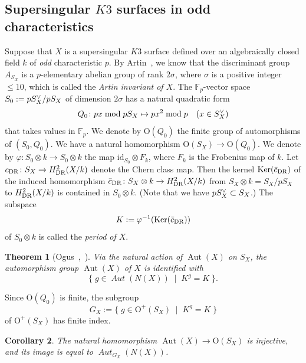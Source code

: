 \documentclass{amsart}
\theoremstyle{plain}
\newtheorem{theorem}{Theorem}[section]
\newtheorem{corollary}[theorem]{Corollary}
\theoremstyle{definition}
\theoremstyle{remark}
\numberwithin{equation}{section}
\numberwithin{table}{section}
\numberwithin{figure}{section}
\newcommand{\F}{\mathord{\mathbb F}}
\newcommand{\set}[2]{\{\; {#1} \; \mid \; {#2} \;  \}}
\newcommand{\tensor}{\otimes}
\newcommand{\inv}{\sp{-1}}
\newcommand{\dual}{\sp{\vee}}
\newcommand{\OG}{\mathord{\mathrm {O}}}
\newcommand{\id}{\mathord{\mathrm {id}}}
\newcommand{\Ker}{\operatorname{\mathrm {Ker}}\nolimits}
\newcommand{\Aut}{\operatorname{\mathrm {Aut}}\nolimits}
\newcommand{\aut}{\operatorname{\mathit {Aut}}\nolimits}
\newcommand{\discgr}[1]{A_{#1}}
\newcommand{\DR}{\mathord{{\rm DR}}}
\newcommand{\Nc}{N}
\begin{document}
\subsection{Supersingular $K3$ surfaces in odd characteristics}\label{subsec:AutssK3}
%
Suppose that  $X$ is a supersingular $K3$ surface defined over an algebraically closed field
$k$ of \emph{odd} characteristic $p$.
By Artin~\cite{MR0371899},
we know that the discriminant group  $\discgr{{S_X}}$
is a $p$-elementary abelian group of rank $2\sigma$,
where $\sigma$ is a positive integer $\le 10$,
which is called the \emph{Artin invariant of $X$}.
The $\F_p$-vector space 
$S_0:=p S_X\dual /p{S_X}$ of dimension $2\sigma$ has a 
natural quadratic form 
$$
Q_0\colon  px \bmod p{S_X} \mapsto px^2 \bmod p \quad (x\in S_X\dual)
$$
that takes values in $\F_p$.
We denote by $\OG(Q_0)$ the finite group of automorphisms of $(S_0, Q_0)$.
We have a natural homomorphism
$\OG({S_X}) \to \OG(Q_0)$.
We denote by  $\varphi\colon S_0\tensor k\to S_0\tensor k$
the map $\id_{S_0}\tensor F_k$,
where $F_k$ is the Frobenius map of $k$.
Let $c_{\DR}\colon {S_X}\to H^2_{\DR}(X/k)$ denote the Chern class map.
Then the kernel $\Ker (\bar{c}_{\DR})$ 
of the induced homomorphism $\bar{c}_{\DR}\colon {S_X}\tensor k \to H^2_{\DR}(X/k)$
from ${S_X}\tensor k=S_X/p S_X$ to $H^2_{\DR}(X/k)$
is contained in $S_0\tensor k$.
(Note that we have $p S_X\dual \subset S_X$.)
The subspace 
$$
K:=\varphi\inv(\Ker (\bar{c}_{\DR}))
$$
of $S_0\tensor k$ is called the 
\emph{period  of $X$}.
%
%
\begin{theorem}[Ogus~\cite{MR563467},~\cite{MR717616}]\label{thm:ssK3aut}
Via the natural action of $\Aut(X)$ on  ${S_X}$, 
the automorphism group $\Aut(X)$ of $X$ is identified with 
$$
\set{g\in \aut(\Nc(X))}{K^g=K}.
$$
\end{theorem}
%
Since $\OG(Q_0)$ is finite,
the subgroup
%
\begin{equation}\label{eq:GXss}
G_X:=\set{g\in \OG^+({S_X})}{K^g=K}
\end{equation}
%
of $\OG^+({S_X})$
has  finite index.
%
\begin{corollary}
The natural homomorphism $\Aut(X)\to \OG(S_X)$
is injective, and its 
 image  is equal to $\aut_{G_X}(\Nc(X))$.
 \end{corollary}
%
%
%
\end{document}
